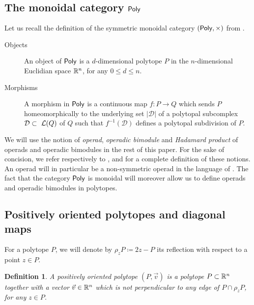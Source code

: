 \documentclass[twoside, 11pt]{amsart}
\newtheorem{definition}{Definition}[section]
\theoremstyle{remark}
\begin{document}
 
\subsection{The monoidal category $\mathsf{Poly}$}

Let us recall the definition of the symmetric monoidal category $(\mathsf{Poly}, \times)$ from \cite[Section~2.1]{MTTV19}.
\begin{description}
\item[{\sc Objects}] An object of $\mathsf{Poly}$ is a $d$-dimensional  polytope $P$ in the $n$-dimensional Euclidian space $\mathbb{R}^n$, for any $0\leq d\leq n$.
\item[{\sc Morphisms}] A morphism in $\mathsf{Poly}$ is a continuous map  $f: P\to Q$ which sends  $P$ homeomorphically to the underlying set $|\mathcal{D}|$ of a polytopal subcomplex $\mathcal{D}\subset~\mathcal{L}(Q)$ of $Q$ 
such that $f^{-1}(\mathcal D)$ defines a polytopal subdivision of $P$.
\end{description}

We will use the notion of \textit{operad}, \textit{operadic bimodule} and \textit{Hadamard product} of operads and operadic bimodules in the rest of this paper. For the sake of concision, we refer respectively to \cite[Section 1.1.1]{mazuir-I}, \cite[Section 1.1.3]{mazuir-I} and \cite[Section 5.1.12]{LodayVallette12} for a complete definition of these notions. An operad will in particular be a non-symmetric operad in the language of \cite{LodayVallette12}. The fact that the category $\mathsf{Poly}$ is monoidal will moreover allow us to define operads and operadic bimodules in polytopes. 

\subsection{Positively oriented polytopes and diagonal maps}

For a polytope $P$, we will denote by $\rho_z P \coloneqq 2z-P$ its reflection with respect to a point $z \in P$. 

\begin{definition}
A \emph{positively oriented polytope} $(P, \vec v)$ is a polytope $P \subset \mathbb{R}^n$ together with a vector $\vec v\in \mathbb{R}^n$ which is not perpendicular to any edge of $P\cap \rho_z P$, for any $z \in P$.
\end{definition}
\end{document}

